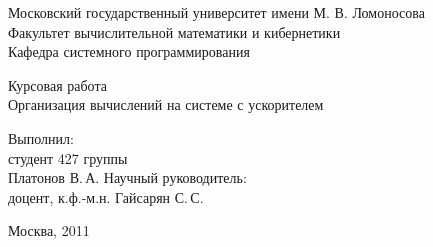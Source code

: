 \begin {titlepage}
  \newpage
  \begin {center}
    Московский государственный университет имени  М. В. Ломоносова\\
    Факультет вычислительной математики и кибернетики\\
    Кафедра системного программирования \\
  \end {center}
  \vspace {5cm}
  \begin {center}
    \LARGE {Курсовая работа}\\
    \Large {Организация вычислений на системе с ускорителем}
  \end {center}
  \vspace {1cm}
  \begin {flushright}
    Выполнил:\\
    студент 427 группы\\
    Платонов В.\,А.\blb
    Научный руководитель:\\
    доцент, к.ф.-м.н. Гайсарян С.\,С.
  \end {flushright}
  \vspace{\fill}
  \begin {center}
  Москва, 2011
  \end {center}
\end {titlepage}
